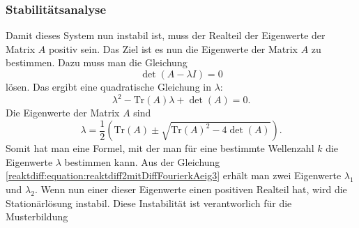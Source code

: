 
\subsubsection{Stabilitätsanalyse}
Damit dieses System nun instabil ist, muss der Realteil der Eigenwerte der Matrix \(A\) positiv sein.
Das Ziel ist es nun die Eigenwerte der Matrix \(A\) zu bestimmen.
Dazu muss man die Gleichung
\begin{equation*}
    \det(A - \lambda I) = 0
\end{equation*}
lösen.
Das ergibt eine quadratische Gleichung in \(\lambda\):
\begin{equation*}
    \lambda^2 - \text{Tr}(A) \lambda + \det(A) = 0.
\end{equation*}
Die Eigenwerte der Matrix \(A\) sind
\begin{equation}
    \lambda = \frac{1}{2} \left( \text{Tr}(A) \pm 
    \sqrt{\text{Tr}(A)^2 - 4 \det(A)} \right).
\label{reaktdiff:equation:reaktdiff2mitDiffFourierkAeig3}
\end{equation}
Somit hat man eine Formel, mit der man für eine bestimmte Wellenzahl \(k\) die Eigenwerte \(\lambda\) bestimmen kann.
Aus der Gleichung \eqref{reaktdiff:equation:reaktdiff2mitDiffFourierkAeig3} erhält man zwei Eigenwerte \(\lambda_1\) und \(\lambda_2\).
Wenn nun einer dieser Eigenwerte einen positiven Realteil hat, wird die Stationärlösung instabil.
Diese Instabilität ist verantworlich für die Musterbildung


